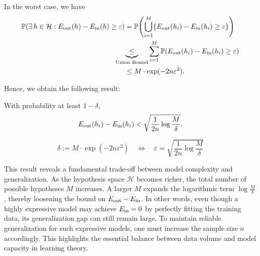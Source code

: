 \documentclass[../main]{subfiles}
\begin{document}
    In the worst case, we have
    \begin{align*}
        \mathbb{P}\!\left(\exists\, h \in \mathcal{H} : E_{\rm out}(h) - E_{\rm in}(h) \ge \varepsilon \right)
        &= \mathbb{P}\!\left(\bigcup_{i=1}^M \{E_{\rm out}(h_i) - E_{\rm in}(h_i) \ge \varepsilon\}\right) \\
        &\!\!\!\!\!\!\!\!\!\underbrace{\le}_{\text{Union Bound}} \sum_{i=1}^M
           \mathbb{P}\!\left(E_{\rm out}(h_i) - E_{\rm in}(h_i) \ge \varepsilon\right) \\
        &\le M \cdot \exp(-2n\varepsilon^2).
    \end{align*}
    
    Hence, we obtain the following result:
    
    \begin{theorem}
    With probability at least $1-\delta$,  
    \begin{equation}
        E_{\rm out}(h_i) - E_{\rm in}(h_i)
        < \sqrt{\frac{1}{2n}\log\frac{M}{\delta}}.
    \end{equation}
    \label{theo-6.3}
    \end{theorem}
\begin{remark}
    \begin{equation}
        \delta:=M\cdot\exp(-2n\varepsilon^2)\quad\Leftrightarrow \quad \varepsilon=\sqrt{\frac{1}{2n}\log\frac{M}{\delta}}
    \end{equation}
\end{remark}
    This result reveals a fundamental trade-off between model complexity and generalization.  
    As the hypothesis space $\mathcal{H}$ becomes richer, the total number of possible hypotheses $M$ increases.  
    A larger $M$ expands the logarithmic term $\log\frac{M}{\delta}$, thereby loosening the bound on $E_{\rm out}-E_{\rm in}$.  
    In other words, even though a highly expressive model may achieve $E_{\rm in}=0$ by perfectly fitting the training data,  
    its generalization gap can still remain large.  
    To maintain reliable generalization for such expressive models, one must increase the sample size $n$ accordingly.  
    This highlights the essential balance between data volume and model capacity in learning theory.
\end{document}
